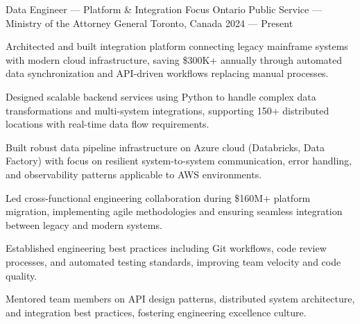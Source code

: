 \begin{cventries}

\cventry%
	{Data Engineer --- Platform \& Integration Focus}
	{Ontario Public Service --- Ministry of the Attorney General}
	{Toronto, Canada}
	{2024 --- Present}
	{
		\begin{cvitems}
			\item Architected and built integration platform connecting legacy mainframe systems with modern cloud infrastructure, saving \$300K+ annually through automated data synchronization and API-driven workflows replacing manual processes.
			\item Designed scalable backend services using Python to handle complex data transformations and multi-system integrations, supporting 150+ distributed locations with real-time data flow requirements.
			\item Built robust data pipeline infrastructure on Azure cloud (Databricks, Data Factory) with focus on resilient system-to-system communication, error handling, and observability patterns applicable to AWS environments.
			\item Led cross-functional engineering collaboration during \$160M+ platform migration, implementing agile methodologies and ensuring seamless integration between legacy and modern systems.
			\item Established engineering best practices including Git workflows, code review processes, and automated testing standards, improving team velocity and code quality.
			\item Mentored team members on API design patterns, distributed system architecture, and integration best practices, fostering engineering excellence culture.
		\end{cvitems}
	}


\end{cventries}
